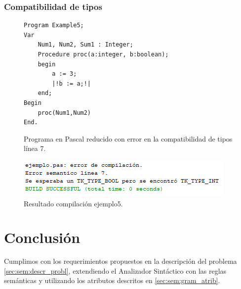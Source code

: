 \subsubsection{Compatibilidad de tipos}

\begin{figure}[H]
\begin{verbatim}
Program Example5;
Var       
    Num1, Num2, Sum1 : Integer;
    Procedure proc(a:integer, b:boolean);
    begin
        a := 3;
        |!b := a;!|
    end;
Begin
    proc(Num1,Num2)
End.
\end{verbatim}
\caption{Programa en Pascal reducido con error en la compatibilidad de tipos línea 7.}
\label{fig:semantico_ej_error_5}
\end{figure}

\begin{figure}[H]
\centering
\includegraphics[]{img/semantico/semantico_ej5.png}
\caption{Resultado compilación ejemplo5.}
\label{fig:semantico_ej5}
\end{figure}



\section{Conclusión}
Cumplimos con los requerimientos propuestos en la descripción del problema \ref{sec:sem:descr_probl}, extendiendo el Analizador Sintáctico con las reglas semánticas y utilizando los atributos descritos en \ref{sec:sem:gram_atrib}. 
